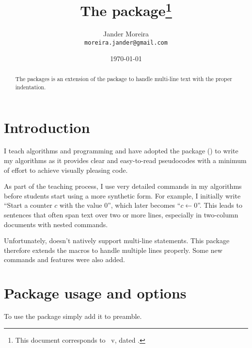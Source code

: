 \documentclass[a4paper, 11pt]{article}
\title{The \PackageName{algxpar} package\thanks{This document corresponds to \PackageName{algxpar}~v\AlgVersion, dated \AlgDate.}}
\author{Jander Moreira\\\texttt{moreira.jander@gmail.com}}
\date{\today}
\begin{document}
\maketitle
\sloppy

\begin{abstract}
    The  packages is an extension of the  package to handle multi-line text with the proper indentation.
\end{abstract}

\tableofcontents

\vspace{2em}



\section{Introduction}
I teach algorithms and programming and have adopted the  package () to write my algorithms as it provides clear and easy-to-read pseudocodes with a minimum of effort to achieve visually pleasing code.

As part of the teaching process, I use very detailed commands in my algorithms before students start using a more synthetic form. For example, I initially write ``Start a counter $c$ with the value $0$'', which later becomes ``${c \gets 0}$''. This leads to sentences that often span text over two or more lines, especially in two-column documents with nested commands.

Unfortunately,  doesn't natively support multi-line statements. This package therefore extends the macros to handle multiple lines properly. Some new commands and features were also added.


\section{Package usage and options}
To use the package simply add it to preamble.
\end{document}

